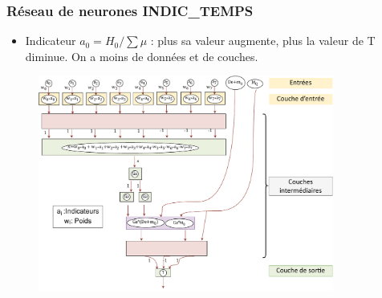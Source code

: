 \documentclass[hyperref={bookmarks=false},aspectratio=169]{beamer}
\begin{document}
\begin{frame}

\frametitle{Réseau de neurones INDIC\_TEMPS }
\begin{itemize}
\item Indicateur $a_0=H_0/\sum \mu$ : plus sa valeur augmente, plus la valeur de T diminue. On a moins de données et de couches.
\end{itemize}
\begin{figure}[H]
	\centering
		\includegraphics[width=9.7cm]{figures/slide_time_value_scheme.pdf}
\end{figure}


\end{frame}

\end{document}
